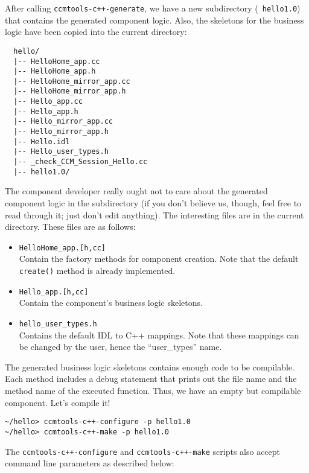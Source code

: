 After calling {\tt ccmtools-c++-generate}, we have a new subdirectory ({\tt
hello1.0}) that contains the generated component logic. Also, the skeletons for
the business logic have been copied into the current directory:

\begin{small}
\begin{verbatim}
  hello/
  |-- HelloHome_app.cc
  |-- HelloHome_app.h
  |-- HelloHome_mirror_app.cc
  |-- HelloHome_mirror_app.h
  |-- Hello_app.cc
  |-- Hello_app.h
  |-- Hello_mirror_app.cc
  |-- Hello_mirror_app.h
  |-- Hello.idl
  |-- Hello_user_types.h
  |-- _check_CCM_Session_Hello.cc
  |-- hello1.0/
\end{verbatim}
\end{small}

The component developer really ought not to care about the generated component
logic in the subdirectory (if you don't believe us, though, feel free to read
through it; just don't edit anything). The interesting files are in the current
directory. These files are as follows:

\begin{itemize}
\item {\tt HelloHome\_app.[h,cc]} \\
Contain the factory methods for component creation. Note that the default {\tt
create()} method is already implemented.
\item {\tt Hello\_app.[h,cc]} \\
Contain the component's business logic skeletons.
\item {\tt hello\_user\_types.h} \\
Contains the default IDL to C++ mappings. Note that these mappings can be
changed by the user, hence the ``user\_types'' name.
\end{itemize}

The generated business logic skeletons contains enough code to be compilable.
Each method includes a debug statement that prints out the file name and the method name of
the executed function. Thus, we have an empty but compilable component. Let's
compile it!
\begin{small}
\begin{verbatim}
~/hello> ccmtools-c++-configure -p hello1.0
~/hello> ccmtools-c++-make -p hello1.0
\end{verbatim}
\end{small}

The {\tt ccmtools-c++-configure} and {\tt ccmtools-c++-make} scripts also accept 
command line parameters as described below:

